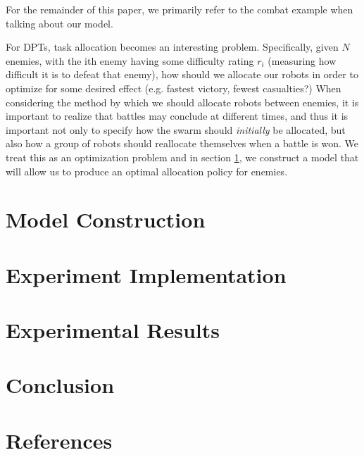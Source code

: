 \documentclass[11pt]{article}
\theoremstyle{definition}
\begin{document}
For the remainder of this paper, we primarily
refer to the combat example when talking about
our model.

For DPTs, task allocation becomes an interesting
problem.
Specifically, given $ N $ enemies,
with the ith enemy having some difficulty
rating $ r_i $ (measuring how difficult it is
to defeat that enemy), how should we allocate our robots
in order to optimize for some desired effect
(e.g. fastest victory, fewest casualties?)
When considering the method by which we should allocate
robots between enemies, it is important to realize
that battles may conclude at different times, and
thus it is important not only to specify how the
swarm should \emph{initially} be allocated,
but also how a group of robots should reallocate
themselves when a battle is won. We treat this
as an optimization problem and in section
\ref{sec:model}, we construct a model that
will allow us to produce an optimal allocation
policy for enemies.

\section{Model Construction}
\label{sec:model}

\section{Experiment Implementation}
\label{sec:implementation}

\section{Experimental Results}
\label{sec:results}

\section{Conclusion}
\label{sec:conclusion}


\section{References}
\end{document}
